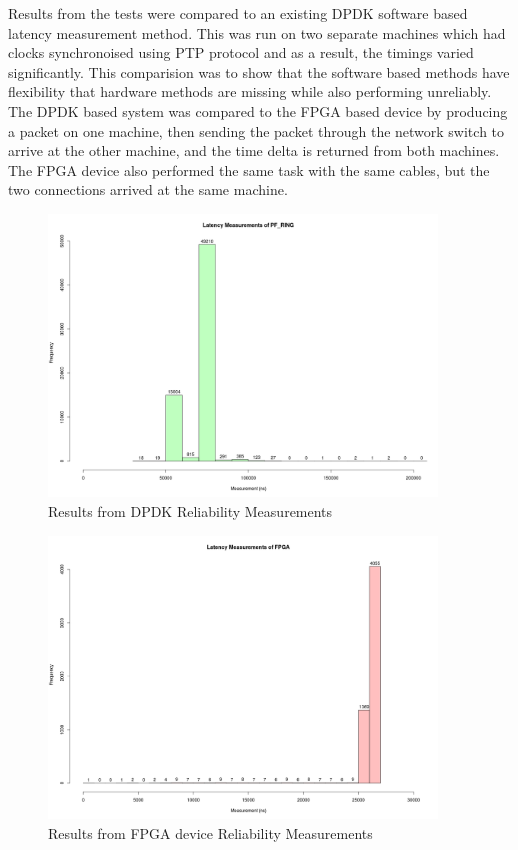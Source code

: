 \par Results from the tests were compared to an existing DPDK software based latency measurement method. This was 
run on two separate machines which had clocks synchronoised using PTP protocol and as a result, the timings varied 
significantly. This comparision was to show that the software based methods have flexibility that hardware methods
are missing while also performing unreliably. The DPDK based system was compared to the FPGA based device by producing
a packet on one machine, then sending the packet through the network switch to arrive at the other machine, and the
time delta is returned from both machines. The FPGA device also performed the same task with the same cables, but 
the two connections arrived at the same machine.

\begin{figure}[H]
    \begin{center}
        \includegraphics[keepaspectratio,height=7.5cm]{Images/pf_ring}
        \caption{Results from DPDK Reliability Measurements}
        \label{fig:DPDKReliability}
    \end{center}
\end{figure}

\begin{figure}[H]
    \begin{center}
        \includegraphics[keepaspectratio,height=7.5cm]{Images/TestPlot}
        \caption{Results from FPGA device Reliability Measurements}
        \label{fig:Test2Plot}
    \end{center}
\end{figure}

